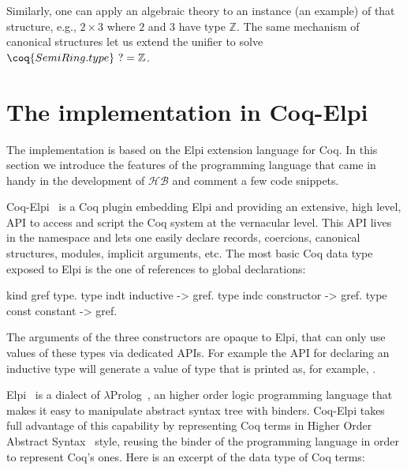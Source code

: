 \documentclass[a4paper,UKenglish,cleveref, autoref]{lipics-v2019}
\newcommand{\HB}{\ensuremath{\mathcal{HB}}}
\theoremstyle{implem}
\theoremstyle{implem}
\theoremstyle{command}
\begin{document}
Similarly, one can apply an algebraic theory to an instance (an example) of that structure, e.g., \(2 \times 3\) where \(2\) and \(3\) have type \(\mathbb{Z}\).
The same mechanism of canonical structures let us extend the unifier to solve \(\coq{SemiRing.type}~? = \mathbb{Z}\).


\section{The implementation in Coq-Elpi}\label{sec:implementation}

The implementation is based on the Elpi
extension language for Coq. In this section we introduce the features of the
programming language that came in handy in the development of \HB{} and
comment a few code snippets.

Coq-Elpi~\cite{CoqElpi} is a Coq plugin embedding
Elpi and providing an
extensive, high level, API to access and script the Coq system at the
vernacular level.
This API lives in the  namespace and lets one easily declare
records, coercions, canonical structures, modules, implicit arguments, etc.
The most basic Coq data type exposed to Elpi is the one of references to global
declarations:

\begin{elpicode}
kind gref  type.                 %
type indt  inductive -> gref.    %
type indc  constructor -> gref.  %
type const constant -> gref.     %
\end{elpicode}

The arguments of the three constructors are opaque to Elpi, that can only use
values of these types via dedicated APIs. For example the API for declaring
an inductive type will generate a value of type  that
is printed as, for example, .

Elpi~\cite{DBLP:conf/lpar/DunchevGCT15} is a dialect
of $\lambda$Prolog~\cite{Miller:2012:PHL:2331097}, an higher order
logic programming language that makes it easy to manipulate abstract syntax
tree with binders. Coq-Elpi takes full advantage of this capability by
representing Coq terms in Higher Order Abstract
Syntax~\cite{10.1145/53990.54010} style, reusing the binder of the programming
language in order to represent Coq's ones. Here is an excerpt of the data
type of Coq terms:
\end{document}
